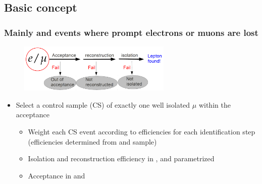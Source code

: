 \documentclass{beamer}
\begin{document}
\subsection{Basic concept}
\begin{frame}
  \frametitle{Mainly \ttbar and \wpj events where prompt electrons or muons are lost}
   \begin{figure}
 \centering
  \includegraphics[width = 0.65\textwidth]{figures/lost-lepton/lepton_veto_sketch.png}
 \end{figure}
      \begin{itemize}
      \item Select a control sample (CS) of exactly one well isolated $\mu$ within the acceptance
        \begin{itemize}
        \item Weight each CS event according to efficiencies for each identification step (efficiencies determined from \ttbar and \wpj sample)
        \item Isolation and reconstruction efficiency in \HT, \MHT and \NJets parametrized
        \item Acceptance in \MHT and \NJets
        \end{itemize}
      \end{itemize}
\end{frame}
\end{document}
